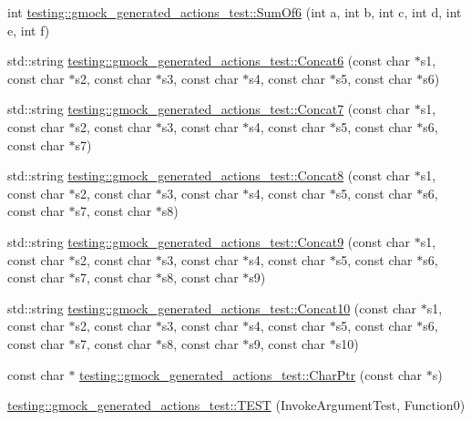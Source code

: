 \begin{DoxyCompactItemize}
int \mbox{\hyperlink{namespacetesting_1_1gmock__generated__actions__test_a3f60acee43510c1603549a1f3bab61ad}{testing\+::gmock\+\_\+generated\+\_\+actions\+\_\+test\+::\+Sum\+Of6}} (int a, int b, int c, int d, int e, int f)
\item 
std\+::string \mbox{\hyperlink{namespacetesting_1_1gmock__generated__actions__test_a396ec2823c0f57354328548dadb56502}{testing\+::gmock\+\_\+generated\+\_\+actions\+\_\+test\+::\+Concat6}} (const char $\ast$s1, const char $\ast$s2, const char $\ast$s3, const char $\ast$s4, const char $\ast$s5, const char $\ast$s6)
\item 
std\+::string \mbox{\hyperlink{namespacetesting_1_1gmock__generated__actions__test_aab764d169a360cb5d3cbcd75dd15aa4a}{testing\+::gmock\+\_\+generated\+\_\+actions\+\_\+test\+::\+Concat7}} (const char $\ast$s1, const char $\ast$s2, const char $\ast$s3, const char $\ast$s4, const char $\ast$s5, const char $\ast$s6, const char $\ast$s7)
\item 
std\+::string \mbox{\hyperlink{namespacetesting_1_1gmock__generated__actions__test_a1f2f8cb9de8d3cc3affccab4e33a78e6}{testing\+::gmock\+\_\+generated\+\_\+actions\+\_\+test\+::\+Concat8}} (const char $\ast$s1, const char $\ast$s2, const char $\ast$s3, const char $\ast$s4, const char $\ast$s5, const char $\ast$s6, const char $\ast$s7, const char $\ast$s8)
\item 
std\+::string \mbox{\hyperlink{namespacetesting_1_1gmock__generated__actions__test_a923b7a16f0ea702fad1c8b2f9be8902d}{testing\+::gmock\+\_\+generated\+\_\+actions\+\_\+test\+::\+Concat9}} (const char $\ast$s1, const char $\ast$s2, const char $\ast$s3, const char $\ast$s4, const char $\ast$s5, const char $\ast$s6, const char $\ast$s7, const char $\ast$s8, const char $\ast$s9)
\item 
std\+::string \mbox{\hyperlink{namespacetesting_1_1gmock__generated__actions__test_aa3e21c9555fb8d1eafd7186d1e9b2db3}{testing\+::gmock\+\_\+generated\+\_\+actions\+\_\+test\+::\+Concat10}} (const char $\ast$s1, const char $\ast$s2, const char $\ast$s3, const char $\ast$s4, const char $\ast$s5, const char $\ast$s6, const char $\ast$s7, const char $\ast$s8, const char $\ast$s9, const char $\ast$s10)
\item 
const char $\ast$ \mbox{\hyperlink{namespacetesting_1_1gmock__generated__actions__test_a4532ef916bb515ce84af3826c95a8560}{testing\+::gmock\+\_\+generated\+\_\+actions\+\_\+test\+::\+Char\+Ptr}} (const char $\ast$s)
\item 
\mbox{\hyperlink{namespacetesting_1_1gmock__generated__actions__test_aee4ab8d88ec59a7e3b91d919a6ed34da}{testing\+::gmock\+\_\+generated\+\_\+actions\+\_\+test\+::\+T\+E\+ST}} (Invoke\+Argument\+Test, Function0)

\end{DoxyCompactItemize}
